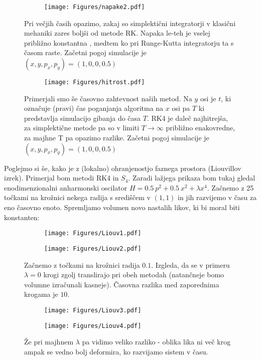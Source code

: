 \documentclass{article}
\begin{document}
\begin{figure}[H]
\centering
\begin{subfigure}{.7\textwidth}
\texttt{[image: Figures/napake2.pdf]}
\end{subfigure}
\caption*{Pri večjih časih opazimo, zakaj so simplektični integratorji v klasični mehaniki zares boljši od metode RK. Napaka le-teh je vselej približno konstantna , medtem ko pri Runge-Kutta integratorju ta s časom raste. Začetni pogoj simulacije je $(x,y,p_x,p_y) = (1,0,0,0.5)$}
\end{figure}

\begin{figure}[H]
\centering
\begin{subfigure}{.7\textwidth}
\texttt{[image: Figures/hitrost.pdf]}
\end{subfigure}
\caption*{Primerjali smo še časovno zahtevnost naših metod. Na $y$ osi je $t$, ki označuje (pravi) čas poganjanja algoritma na $x$ osi pa $T$ ki predstavlja simulacijo gibanja do časa $T$. RK4 je daleč najhitrejša, za simplektične metode pa so v limiti $T \to \infty$ približno enakovredne, za majhne T pa opazimo razlike. Začetni pogoj simulacije je $(x,y,p_x,p_y) = (1,0,0,0.5)$}
\end{figure}

Poglejmo si še, kako je z (lokalno) ohranjenostjo faznega prostora (Liouvillov izrek). Primerjal bom metodi RK4 in $S_4$. Zaradi lažjega prikaza bom tukaj gledal enodimenzionalni anharmonski oscilator $H = 0.5\ p^2 + 0.5 \ x^2 + \lambda x^4$. Začnemo z 25 točkami na krožnici nekega radija s središčem v $(1,1)$ in jih razvijemo v času za eno časovno enoto. Spremljamo volumen novo nastalih likov, ki bi moral biti konstanten:

\begin{figure}[H]
\centering
\begin{subfigure}{.49\textwidth}
\texttt{[image: Figures/Liouv1.pdf]}
\end{subfigure}
\begin{subfigure}{.49\textwidth}
\texttt{[image: Figures/Liouv2.pdf]}
\end{subfigure}
\caption*{Začnemo z točkami na krožnici radija $0.1$. Izgleda, da se v primeru $\lambda=0$ krogi zgolj translirajo pri obeh metodah (natančneje bomo volumne izračunali kasneje). Časovna razlika med zaporednima krogama je $10$.}
\end{figure}

\begin{figure}[H]
\centering
\begin{subfigure}{.49\textwidth}
\texttt{[image: Figures/Liouv3.pdf]}
\end{subfigure}
\begin{subfigure}{.49\textwidth}
\texttt{[image: Figures/Liouv4.pdf]}
\end{subfigure}
\caption*{Že pri majhnem $\lambda$ pa vidimo veliko razliko - oblika lika ni več krog ampak se vedno bolj deformira, ko razvijamo sistem v času.}
\end{figure}
\end{document}
